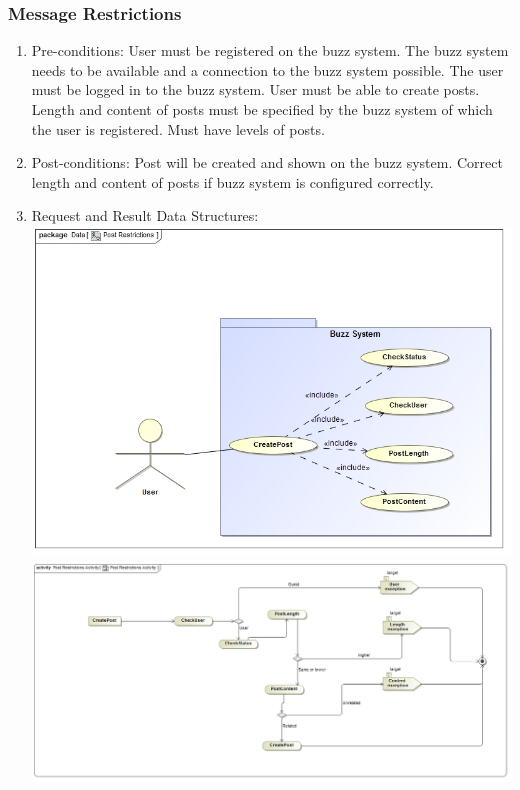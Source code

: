\documentclass[12pt, oneside]{article}
\begin{document}
\subsubsection{Message Restrictions}
\begin{enumerate}
 \item Pre-conditions:  User must be registered on the buzz system. The buzz system needs to be available and a connection to the buzz system possible. The user must be logged in to the buzz system. User must be able to create posts. Length and content of posts must be specified by the buzz system of which the user is registered. Must have levels of posts.
 
 \item Post-conditions: Post will be created and shown on the buzz system. Correct length and content of posts if buzz system is configured correctly.
   \\
 \item Request and Result Data Structures:\\
  \includegraphics[scale=0.4]{PostRestrictions}\\
 \includegraphics[scale=0.35]{PostRestrictionsActivity} 
\end{enumerate}
\end{document}
